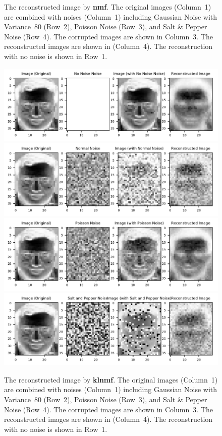 \begin{figure}
	\caption{The reconstructed image by \textbf{nmf}. The original images (Column~1) are combined with noises (Column~1) including Gaussian Noise with Variance~$80$ (Row~2), Poisson Noise (Row~3), and Salt \& Pepper Noise (Row~4). The corrupted images are shown in Column~3. The reconstructed images are shown in (Column~4). The reconstruction with no noise is shown in Row~1.}\label{noisesnmff}
\end{figure}
\begin{figure}
	\centering
	\includegraphics[scale=.9]{Result_Multiplication_KL_Divergence_No_Noise_Comparison}\\
	\includegraphics[scale=.9]{Result_Multiplication_KL_Divergence_Normal_Comparison}\\
	\includegraphics[scale=.9]{Result_Multiplication_KL_Divergence_Poisson_Comparison}\\
	\includegraphics[scale=.9]{Result_Multiplication_KL_Divergence_Salt_and_Pepper_Comparison}
\caption{The reconstructed image by \textbf{klnmf}. The original images (Column~1) are combined with noises (Column~1) including Gaussian Noise with Variance~$80$ (Row~2), Poisson Noise (Row~3), and Salt \& Pepper Noise (Row~4). The corrupted images are shown in Column~3. The reconstructed images are shown in (Column~4). The reconstruction with no noise is shown in Row~1.}\label{noisesklnmff}
\end{figure}
